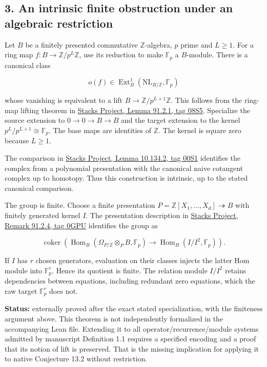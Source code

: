 \hypertarget{native:an-intrinsic-finite-obstruction-under-an-algebraic-restriction}{%
\subsection{3. An intrinsic finite obstruction under an algebraic
restriction}\label{native:an-intrinsic-finite-obstruction-under-an-algebraic-restriction}}

Let \(B\) be a finitely presented commutative \(\mathbb Z\)-algebra,
\(p\) prime and \(L\ge1\). For a ring map
\(f:B\to\mathbb Z/p^L\mathbb Z\), use its reduction to make
\(\mathbb F_p\) a \(B\)-module. There is a canonical class

\[o(f)\in\operatorname{Ext}^1_B(\mathrm{NL}_{B/\mathbb Z},\mathbb F_p)\]

whose vanishing is equivalent to a lift
\(B\to\mathbb Z/p^{L+1}\mathbb Z\). This follows from the ring-map
lifting theorem in
\href{https://stacks.math.columbia.edu/tag/08S5}{Stacks Project, Lemma
91.2.1, tag 08S5}. Specialize the source extension to
\(0\to0\to B\to B\) and the target extension to the kernel
\(p^L/p^{L+1}\cong\mathbb F_p\). The base maps are identities of
\(\mathbb Z\). The kernel is square zero because \(L\ge1\).

The comparison in
\href{https://stacks.math.columbia.edu/tag/00S1}{Stacks Project, Lemma
10.134.2, tag 00S1} identifies the complex from a polynomial
presentation with the canonical naive cotangent complex up to homotopy.
Thus this construction is intrinsic, up to the stated canonical
comparison.

The group is finite. Choose a finite presentation
\(P=\mathbb Z[X_1,\ldots,X_d]\twoheadrightarrow B\) with finitely
generated kernel \(I\). The presentation description in
\href{https://stacks.math.columbia.edu/tag/0GPU}{Stacks Project, Remark
91.2.4, tag 0GPU} identifies the group as

\[\operatorname{coker}\left(\operatorname{Hom}_B(\Omega_{P/\mathbb Z}\otimes_P B,\mathbb F_p)\longrightarrow\operatorname{Hom}_B(I/I^2,\mathbb F_p)\right).\]

If \(I\) has \(r\) chosen generators, evaluation on their classes
injects the latter Hom module into \(\mathbb F_p^r\). Hence its quotient
is finite. The relation module \(I/I^2\) retains dependencies between
equations, including redundant zero equations, which the raw target
\(\mathbb F_p^r\) does not.

\textbf{Status:} externally proved after the exact stated
specialization, with the finiteness argument above. This theorem is not
independently formalized in the accompanying Lean file. Extending it to
all operator/recurrence/module systems admitted by manuscript Definition
1.1 requires a specified encoding and a proof that its notion of lift is
preserved. That is the missing implication for applying it to native
Conjecture 13.2 without restriction.

